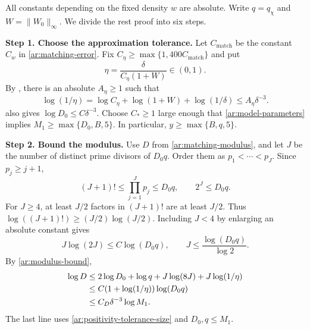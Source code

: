 \documentclass[twoside]{aomart}
\makeatletter
\theoremstyle{paperplain}
\theoremstyle{paperdefinition}
\renewenvironment{proof}[1][\proofname]{\par\pushQED{\qed}%
  \normalfont\topsep6\p@\@plus3\p@\relax\trivlist
  \item[\hskip\labelsep\itshape #1\@addpunct{.}]\ignorespaces
}{\popQED\endtrivlist\@endpefalse}
\numberwithin{equation}{section}
\makeatother
\begin{document}
\begin{proof}
All constants depending on the fixed density $w$ are absolute.
Write $q=q_\chi$ and $W=\|W_0\|_\infty$. We divide the rest proof into six steps.

\par
\medskip
\noindent\textbf{Step 1. Choose the approximation tolerance.}
Let $C_{\mathrm{match}}$ be the constant $C_w$ in
\eqref{ar:matching-error}. Fix
$C_\eta\ge\max\{1,400C_{\mathrm{match}}\}$ and put
\begin{equation*}
 \eta=\frac{\delta}{C_\eta(1+W)}\in(0,1).
 \end{equation*}
By , there is an absolute $A_\eta\ge1$ such that
\begin{equation}
 \log(1/\eta)
 =\log C_\eta+\log(1+W)+\log(1/\delta)
 \le A_\eta\delta^{-3}.
 \label{ar:positivity-tolerance-size}
\end{equation}
 also gives $\log D_0\le C\delta^{-3}$.
Choose $C_*\ge1$ large enough that
\eqref{ar:model-parameters} implies $M_1\ge\max\{D_0,B,5\}$.
In particular, $y\ge\max\{B,q,5\}$.

\par
\medskip
\noindent\textbf{Step 2. Bound the modulus.}
Use $D$ from \eqref{ar:matching-modulus}, and let $J$ be the number
of distinct prime divisors of $D_0q$.
Order them as $p_1<\cdots<p_J$. Since $p_j\ge j+1$,
\begin{equation*}
 (J+1)!\le\prod_{j=1}^Jp_j\le D_0q,
 \qquad 2^J\le D_0q.
 \end{equation*}
For $J\ge4$, at least $J/2$ factors in $(J+1)!$ are at least $J/2$.
Thus $\log((J+1)!)\ge(J/2)\log(J/2)$.
Including $J<4$ by enlarging an absolute constant gives
\begin{equation*}
 J\log(2J)\le C\log(D_0q),\qquad
 J\le\frac{\log(D_0q)}{\log2}.
 \end{equation*}
By \eqref{ar:modulus-bound},
\begin{align}
 \log D
 &\le2\log D_0+\log q+J\log(8J)+J\log(1/\eta) \notag\\
 &\le C(1+\log(1/\eta))\log(D_0q) \notag\\
 &\le C_D\delta^{-3}\log M_1.
 \label{ar:modulus-size}
\end{align}
The last line uses \eqref{ar:positivity-tolerance-size} and
$D_0,q\le M_1$.


\end{proof}
\end{document}

